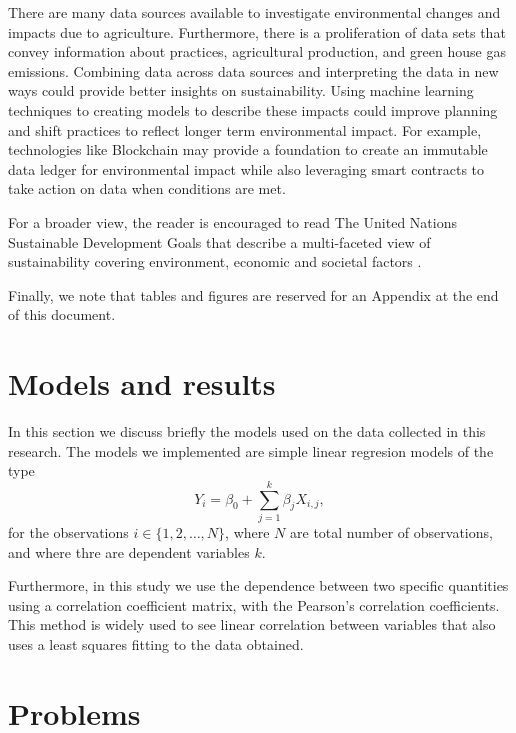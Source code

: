 \documentclass[11pt]{article}
\numberwithin{equation}{section}
\begin{document}
There are many data sources available to investigate environmental changes and impacts due to agriculture. Furthermore, there is a proliferation of data sets that convey information about practices, agricultural production, and green house gas emissions. Combining data across data sources and interpreting the data in new ways could provide better insights on sustainability. Using machine learning techniques to creating models to describe these impacts could improve planning and shift practices to reflect longer term environmental impact. For example, technologies like Blockchain may provide a foundation to create an immutable data ledger for environmental impact while also leveraging smart contracts to take action on data when conditions are met.

For a broader view, the reader is encouraged to read The United Nations Sustainable Development Goals that describe a multi-faceted view of sustainability covering environment, economic and societal factors \cite{UN-edgar}.

Finally, we note that tables and figures are reserved for an Appendix at the end of this document.


\section{Models and results}\label{Corr_modl}

In this section we discuss briefly the models used on the data collected  in this research. The models we implemented are simple linear regresion models of the type 
\begin{equation}
Y_i = \beta_0 + \sum_{j=1}^k \beta_j X_{i,j},    
\end{equation}
 for the observations $i\in \{1, 2, \dots, N\}$, where $N$ are total number of observations, and where thre are dependent variables $k$.
 
 Furthermore, in this study we use the dependence between two specific quantities using  a correlation coefficient matrix, with  the Pearson's correlation coefficients. This method is widely used to see linear correlation between variables that also uses a least squares fitting to the data obtained.

 
\section{Problems}\label{problems}
\end{document}
